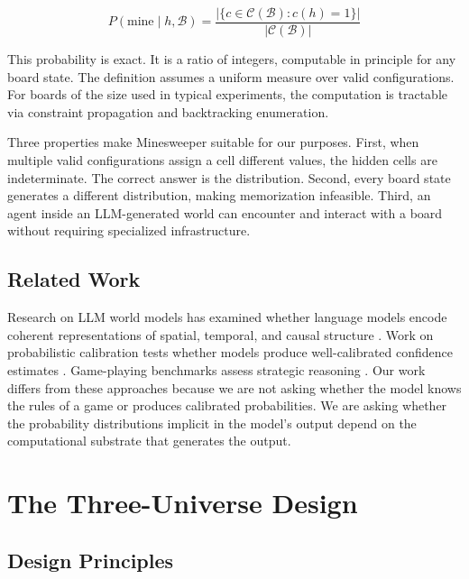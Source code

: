 \documentclass[12pt,a4paper]{article}
\begin{document}
\begin{equation}
P(\text{mine} \mid h, \mathcal{B}) = \frac{|\{c \in \mathcal{C}(\mathcal{B}) : c(h) = 1\}|}{|\mathcal{C}(\mathcal{B})|}
\label{eq:mine_prob}
\end{equation}

This probability is exact. It is a ratio of integers, computable in principle for any board state. The definition assumes a uniform measure over valid configurations. For boards of the size used in typical experiments, the computation is tractable via constraint propagation and backtracking enumeration.

Three properties make Minesweeper suitable for our purposes. First, when multiple valid configurations assign a cell different values, the hidden cells are indeterminate. The correct answer is the distribution. Second, every board state generates a different distribution, making memorization infeasible. Third, an agent inside an LLM-generated world can encounter and interact with a board without requiring specialized infrastructure.

\subsection{Related Work}
\label{sec:related}

Research on LLM world models has examined whether language models encode coherent representations of spatial, temporal, and causal structure \citep{li2023emergent,gurnee2024}. Work on probabilistic calibration tests whether models produce well-calibrated confidence estimates \citep{kadavath2022}. Game-playing benchmarks assess strategic reasoning \citep{tian2024}. Our work differs from these approaches because we are not asking whether the model knows the rules of a game or produces calibrated probabilities. We are asking whether the probability distributions implicit in the model's output depend on the computational substrate that generates the output.

\section{The Three-Universe Design}
\label{sec:three_universes}

\subsection{Design Principles}
\label{sec:design_principles}
\end{document}
